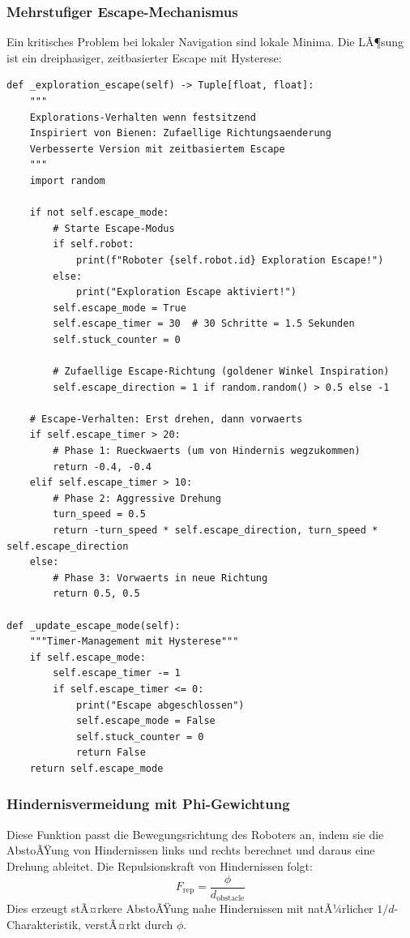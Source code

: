 ﻿\documentclass[a4paper,12pt]{article}
\theoremstyle{definition}
\begin{document}
\subsubsection{Mehrstufiger Escape-Mechanismus}

Ein kritisches Problem bei lokaler Navigation sind lokale Minima. Die LÃ¶sung ist ein dreiphasiger, zeitbasierter Escape mit Hysterese:

\begin{lstlisting}[style=pythonstyle, caption={Dreiphasiger Exploration-Escape}]
def _exploration_escape(self) -> Tuple[float, float]:
    """
    Explorations-Verhalten wenn festsitzend
    Inspiriert von Bienen: Zufaellige Richtungsaenderung
    Verbesserte Version mit zeitbasiertem Escape
    """
    import random
    
    if not self.escape_mode:
        # Starte Escape-Modus
        if self.robot:
            print(f"Roboter {self.robot.id} Exploration Escape!")
        else:
            print("Exploration Escape aktiviert!")
        self.escape_mode = True
        self.escape_timer = 30  # 30 Schritte = 1.5 Sekunden
        self.stuck_counter = 0
        
        # Zufaellige Escape-Richtung (goldener Winkel Inspiration)
        self.escape_direction = 1 if random.random() > 0.5 else -1
    
    # Escape-Verhalten: Erst drehen, dann vorwaerts
    if self.escape_timer > 20:
        # Phase 1: Rueckwaerts (um von Hindernis wegzukommen)
        return -0.4, -0.4
    elif self.escape_timer > 10:
        # Phase 2: Aggressive Drehung
        turn_speed = 0.5
        return -turn_speed * self.escape_direction, turn_speed * self.escape_direction
    else:
        # Phase 3: Vorwaerts in neue Richtung
        return 0.5, 0.5

def _update_escape_mode(self):
    """Timer-Management mit Hysterese"""
    if self.escape_mode:
        self.escape_timer -= 1
        if self.escape_timer <= 0:
            print("Escape abgeschlossen")
            self.escape_mode = False
            self.stuck_counter = 0
            return False
    return self.escape_mode
\end{lstlisting}

\subsubsection{Hindernisvermeidung mit Phi-Gewichtung}
Diese Funktion passt die Bewegungsrichtung des Roboters an, indem sie die AbstoÃŸung von Hindernissen links und rechts berechnet und daraus eine Drehung ableitet. Die Repulsionskraft von Hindernissen folgt:
\begin{equation}
F_{\text{rep}} = \frac{\phi}{d_{\text{obstacle}}}
\end{equation}
Dies erzeugt stÃ¤rkere AbstoÃŸung nahe Hindernissen mit natÃ¼rlicher $1/d$-Charakteristik, verstÃ¤rkt durch $\phi$.
\end{document}

